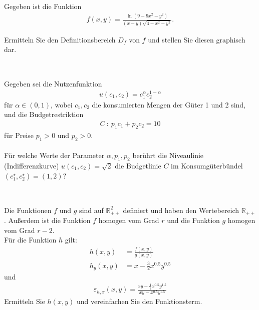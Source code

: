 \subsection*{}
Gegeben ist die Funktion 
\begin{align*}
f(x,y)
=
\frac{\ln(9 - 9 x^2 - y^2)}{(x-y) \sqrt{4 - x^2 - y^2}}.
\end{align*}

Ermitteln Sie den Definitionsbereich $ D_f $ von $ f $ und stellen Sie diesen graphisch dar.
\\
\\
\subsection*{}
Gegeben sei die Nutzenfunktion
\begin{align*}
u(c_1,c_2) = c_1^\alpha c_2^{1-\alpha}
\end{align*}
für $ \alpha \in (0,1) $, wobei $ c_1,c_2 $ die konsumierten Mengen der Güter 1 und 2 sind, und die Budgetrestriktion
\begin{align*}
C \ : \ p_1 c_1 + p_2 c_2 = 10
\end{align*}
für Preise $ p_1 > 0  $ und $ p_2 > 0 $.\\
\\
Für welche Werte der Parameter $ \alpha, p_1, p_2 $ berührt die Niveaulinie (Indifferenzkurve) $ u(c_1,c_2) = \sqrt{2} $ die Budgetlinie $ C $ im Konsumgüterbündel $ (c_1^\star,c_2^\star)  = (1,2)$?
\\ 
\\
\subsection*{}
Die Funktionen $ f $ und $ g $ sind auf $ \mathbb{R}^2_{++} $ definiert und haben den Wertebereich $ \mathbb{R}_{++} $.
Außerdem ist die Funktion $ f $ homogen vom Grad $ r $ und die Funktion $ g $ homogen vom Grad $ r -2 $.\\
Für die Funktion $ h $ gilt:
\begin{align*}
h(x,y) &= \frac{f(x,y)}{g(x,y)}\\
h_y(x,y) &= x  - \frac{3}{2} x^{0.5} y^{0.5}
\end{align*}
und
\begin{align*}
\varepsilon_{h,x}(x,y)
= 
\frac{xy - \frac{1}{2}x^{0.5} y^{1.5}}{xy - x^{0.5} y^{1.5}}
\end{align*}
Ermitteln Sie $ h(x,y) $ und vereinfachen Sie den Funktionsterm.
\newpage


